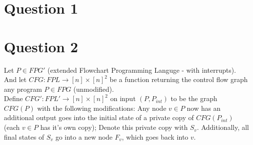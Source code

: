 \documentclass{article}
\begin{document}
\author{Yosef Goren}
\title{}
\maketitle

\section*{Question 1}

\section*{Question 2}
Let $P\in FPG'$ (extended Flowchart Programming Languge - with interrupts).\\
And let $CFG:FPL\longrightarrow [n]\times [n]^2$ be a function returning
the control flow graph any program $P\in FPG$ (unmodified).\\

Define $CFG':FPL'\longrightarrow [n]\times [n]^2$ on input $(P,P_{int})$ to be the graph
$CFG(P)$ with the following modifications:
Any node $v\in P$ now has an additional output
goes into the initial
state of a private copy of $CFG(P_{int})$
(each $v\in P$ has it's own copy); Denote this private
copy with $S_v$. Additionally, all final states of $S_v$ go 
into a new node $F_v$, which goes back into $v$.\\
\end{document}
